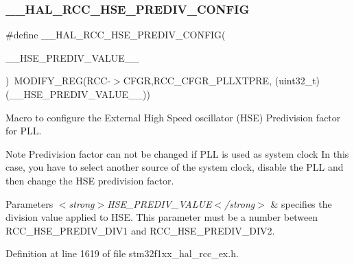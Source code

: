 \subsubsection{\texorpdfstring{\+\_\+\+\_\+\+H\+A\+L\+\_\+\+R\+C\+C\+\_\+\+H\+S\+E\+\_\+\+P\+R\+E\+D\+I\+V\+\_\+\+C\+O\+N\+F\+IG}{\_\_HAL\_RCC\_HSE\_PREDIV\_CONFIG}}
{\footnotesize\ttfamily \#define \+\_\+\+\_\+\+H\+A\+L\+\_\+\+R\+C\+C\+\_\+\+H\+S\+E\+\_\+\+P\+R\+E\+D\+I\+V\+\_\+\+C\+O\+N\+F\+IG(\begin{DoxyParamCaption}\item[{}]{\+\_\+\+\_\+\+H\+S\+E\+\_\+\+P\+R\+E\+D\+I\+V\+\_\+\+V\+A\+L\+U\+E\+\_\+\+\_\+ }\end{DoxyParamCaption})~M\+O\+D\+I\+F\+Y\+\_\+\+R\+EG(R\+CC-\/$>$C\+F\+GR,R\+C\+C\+\_\+\+C\+F\+G\+R\+\_\+\+P\+L\+L\+X\+T\+P\+RE, (uint32\+\_\+t)(\+\_\+\+\_\+\+H\+S\+E\+\_\+\+P\+R\+E\+D\+I\+V\+\_\+\+V\+A\+L\+U\+E\+\_\+\+\_\+))}



Macro to configure the External High Speed oscillator (H\+SE) Predivision factor for P\+LL. 

\begin{DoxyNote}{Note}
Predivision factor can not be changed if P\+LL is used as system clock In this case, you have to select another source of the system clock, disable the P\+LL and then change the H\+SE predivision factor. 
\end{DoxyNote}

\begin{DoxyParams}{Parameters}
{\em $<$strong$>$\+H\+S\+E\+\_\+\+P\+R\+E\+D\+I\+V\+\_\+\+V\+A\+L\+U\+E$<$/strong$>$} & specifies the division value applied to H\+SE. This parameter must be a number between R\+C\+C\+\_\+\+H\+S\+E\+\_\+\+P\+R\+E\+D\+I\+V\+\_\+\+D\+I\+V1 and R\+C\+C\+\_\+\+H\+S\+E\+\_\+\+P\+R\+E\+D\+I\+V\+\_\+\+D\+I\+V2. \\
\hline
\end{DoxyParams}


Definition at line 1619 of file stm32f1xx\+\_\+hal\+\_\+rcc\+\_\+ex.\+h.

